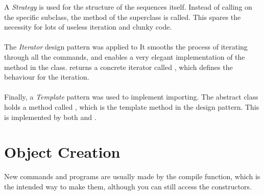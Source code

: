 A \textit{Strategy} is used for the structure of the sequences itself. Instead of calling on the specific subclass, the  method of the superclass is called. This spares the necessity for lots of useless iteration and clunky code. \\~\\

The \textit{Iterator} design pattern was applied to It smooths the process of iterating through all the commands, and enables a very elegant implementation of the  method in the  class.  returns a concrete iterator called , which defines the behaviour for the iteration. \\~\\

Finally, a \textit{Template} pattern was used to implement importing. The  abstract class holds a method called , which is the template method in the design pattern. This is implemented by both  and . 

\section{Object Creation}
New commands and programs are usually made by the compile function, which is the intended way to make them, although you can still access the constructors. 
